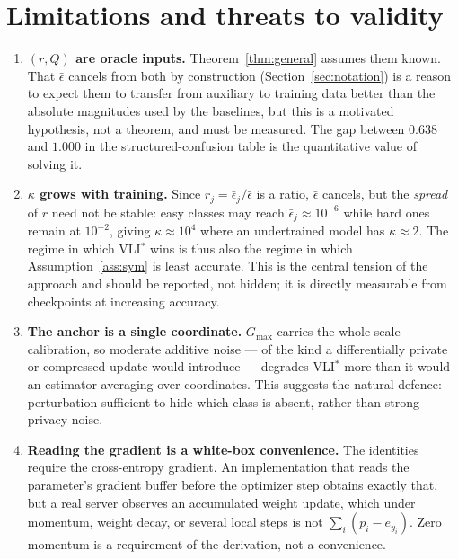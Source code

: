 \documentclass[11pt]{article}
\theoremstyle{remark}
\begin{document}
\section{Limitations and threats to validity}
\label{sec:limits}

\begin{enumerate}
\item \textbf{$(r,Q)$ are oracle inputs.} Theorem~\ref{thm:general} assumes
  them known. That $\bar\epsilon$ cancels from both by construction
  (Section~\ref{sec:notation}) is a reason to expect them to transfer from
  auxiliary to training data better than the absolute magnitudes used by the
  baselines, but this is a motivated hypothesis, not a theorem, and must be
  measured. The gap between $0.638$ and $1.000$ in the
  structured-confusion table is the quantitative value of solving it.

\item \textbf{$\kappa$ grows with training.} Since $r_j = \bar\epsilon_j/\bar\epsilon$
  is a ratio, $\bar\epsilon$ cancels, but the \emph{spread} of $r$ need not
  be stable: easy classes may reach $\bar\epsilon_j\approx10^{-6}$ while hard
  ones remain at $10^{-2}$, giving $\kappa \approx 10^4$ where an
  undertrained model has $\kappa \approx 2$. The regime in which VLI$^*$
  wins is thus also the regime in which Assumption~\ref{ass:sym} is least
  accurate. This is the central tension of the approach and should be
  reported, not hidden; it is directly measurable from checkpoints at
  increasing accuracy.

\item \textbf{The anchor is a single coordinate.} $G_{\max}$ carries the
  whole scale calibration, so moderate additive noise --- of the kind a
  differentially private or compressed update would introduce --- degrades
  VLI$^*$ more than it would an estimator averaging over coordinates. This
  suggests the natural defence: perturbation sufficient to hide which class
  is absent, rather than strong privacy noise.

\item \textbf{Reading the gradient is a white-box convenience.} The
  identities require the cross-entropy gradient. An implementation that reads
  the parameter's gradient buffer before the optimizer step obtains exactly
  that, but a real server observes an accumulated weight update, which under
  momentum, weight decay, or several local steps is not $\sum_i(p_i-e_{y_i})$.
  Zero momentum is a requirement of the derivation, not a convenience.


\end{enumerate}
\end{document}
